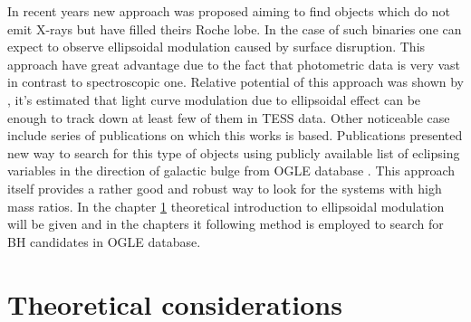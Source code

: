 \documentclass{pracalicmgr}
\begin{document}
In recent years new approach was proposed aiming to find objects which do not emit X-rays but have filled theirs Roche lobe. In the case of such binaries one can expect to
observe ellipsoidal modulation caused by surface disruption. This approach have great advantage due to the fact that photometric data is very vast in contrast to spectroscopic one.
Relative potential of this approach was shown by \citep{masuda_prospects_2019}, it's estimated that light curve modulation due to ellipsoidal effect can be enough to track down
at least few of them in TESS data. Other noticeable case include series of publications \citep{gomel_search_2021,gomel_search_2021-1,gomel_search_2021-2} on which this works is based.
Publications presented new way to search for this type of objects using publicly available list of eclipsing variables in the direction of galactic bulge from OGLE database
 \citep{soszynski_ogle_2016}. This approach itself provides a rather good and robust way to look for the systems with high mass ratios. In the chapter \ref{theo} theoretical
introduction to ellipsoidal modulation will be given and in the chapters it following method is employed to search for BH candidates in OGLE database.
\chapter{Theoretical considerations}\label{theo}
\end{document}
